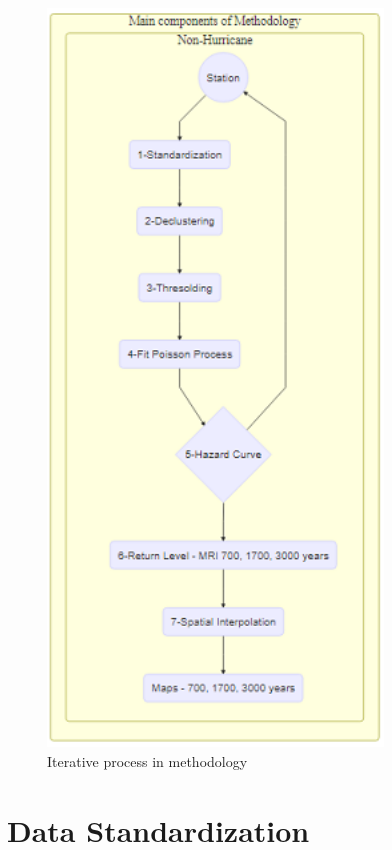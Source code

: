 \documentclass[12pt,oneside]{reedthesis}
\begin{document}
\footnotesize
\begin{figure}

{\centering \includegraphics[width=3.51in]{figure/main_methodology} 

}

\caption{Iterative process in methodology}\label{fig:mainmethodology}
\end{figure}
\normalsize

\hypertarget{rmd-standartization}{%
\section{Data Standardization}\label{rmd-standartization}}
\end{document}
